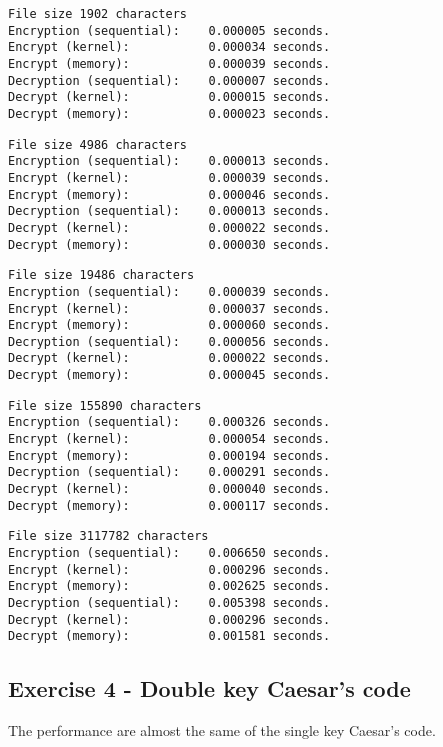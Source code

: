 \documentclass[a4paper]{article}
\begin{document}
\begin{verbatim}
File size 1902 characters
Encryption (sequential):    0.000005 seconds.
Encrypt (kernel):           0.000034 seconds.
Encrypt (memory):           0.000039 seconds.
Decryption (sequential):    0.000007 seconds.
Decrypt (kernel):           0.000015 seconds.
Decrypt (memory):           0.000023 seconds.
\end{verbatim}
\begin{verbatim}
File size 4986 characters
Encryption (sequential):    0.000013 seconds.
Encrypt (kernel):           0.000039 seconds.
Encrypt (memory):           0.000046 seconds.
Decryption (sequential):    0.000013 seconds.
Decrypt (kernel):           0.000022 seconds.
Decrypt (memory):           0.000030 seconds.
\end{verbatim}
\begin{verbatim}
File size 19486 characters
Encryption (sequential):    0.000039 seconds.
Encrypt (kernel):           0.000037 seconds.
Encrypt (memory):           0.000060 seconds.
Decryption (sequential):    0.000056 seconds.
Decrypt (kernel):           0.000022 seconds.
Decrypt (memory):           0.000045 seconds.
\end{verbatim}
\begin{verbatim}
File size 155890 characters
Encryption (sequential):    0.000326 seconds.
Encrypt (kernel):           0.000054 seconds.
Encrypt (memory):           0.000194 seconds.
Decryption (sequential):    0.000291 seconds.
Decrypt (kernel):           0.000040 seconds.
Decrypt (memory):           0.000117 seconds.
\end{verbatim}
\begin{verbatim}
File size 3117782 characters
Encryption (sequential):    0.006650 seconds.
Encrypt (kernel):           0.000296 seconds.
Encrypt (memory):           0.002625 seconds.
Decryption (sequential):    0.005398 seconds.
Decrypt (kernel):           0.000296 seconds.
Decrypt (memory):           0.001581 seconds.
\end{verbatim}

\subsection{Exercise 4 - Double key Caesar's code}

The performance are almost the same of the single key Caesar's code.
\end{document}
